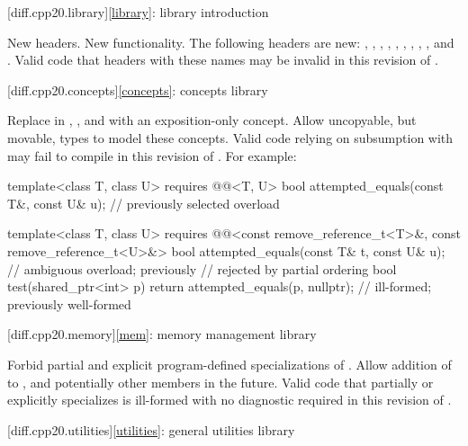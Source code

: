 [diff.cpp20.library]{\ref{library}: library introduction}

\change
New headers.
\rationale
New functionality.
\effect
The following \Cpp{} headers are new:
,
,
,
,
,
,
,
,
, and
.
Valid \CppXX{} code that  headers with these names may be
invalid in this revision of \Cpp{}.

[diff.cpp20.concepts]{\ref{concepts}: concepts library}

\change
Replace  in ,
, and 
with an exposition-only concept.
\rationale
Allow uncopyable, but movable, types to model these concepts.
\effect
Valid \CppXX{} code relying on subsumption
with 
may fail to compile in this revision of \Cpp{}.
For example:
\begin{codeblock}
template<class T, class U>
  requires @@<T, U>
bool attempted_equals(const T&, const U& u);    // previously selected overload

template<class T, class U>
  requires @@<const remove_reference_t<T>&, const remove_reference_t<U>&>
bool attempted_equals(const T& t, const U& u);  // ambiguous overload; previously
                                                // rejected by partial ordering
bool test(shared_ptr<int> p) {
  return attempted_equals(p, nullptr);          // ill-formed; previously well-formed
}
\end{codeblock}

[diff.cpp20.memory]{\ref{mem}: memory management library}

\change
Forbid partial and explicit program-defined specializations
of .
\rationale
Allow addition of  to ,
and potentially other members in the future.
\effect
Valid \CppXX{} code
that partially or explicitly specializes 
is ill-formed with no diagnostic required in this revision of \Cpp{}.

[diff.cpp20.utilities]{\ref{utilities}: general utilities library}

